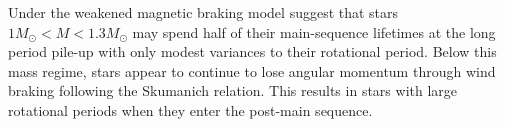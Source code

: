 Under the weakened magnetic braking model \citet{david_further_2022} suggest that stars $1M_{\odot} < M < 1.3M_{\odot}$  may spend half of their main-sequence lifetimes at the long period pile-up with only modest variances to their rotational period.
Below this mass regime, stars appear to continue to lose angular momentum through wind braking following the Skumanich relation.
This results in stars with large rotational periods when they enter the post-main sequence.


%
